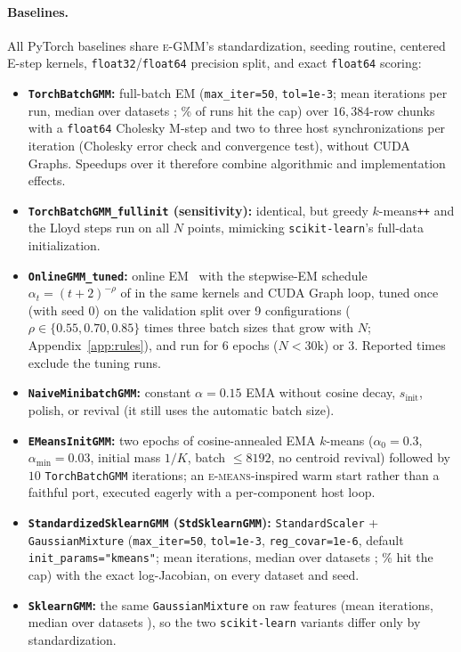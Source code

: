 \documentclass[10pt]{article} %
\newcommand{\egmm}{\textsc{e-GMM}}
\newcommand{\emeans}{\textsc{e-means}}
\begin{document}
\paragraph{Baselines.} All PyTorch baselines share \egmm{}'s standardization, seeding routine, centered E-step kernels, \texttt{float32}/\texttt{float64} precision split, and exact \texttt{float64} scoring:
\begin{itemize}[leftmargin=*,nosep]
  \item \textbf{\texttt{TorchBatchGMM}:} full-batch EM (\texttt{max\_iter=50}, \texttt{tol=1e-3}; mean \rItMeanTorchBatchGMM{} iterations per run, median over datasets \rItMedTorchBatchGMM{}; \rPCapShareTB\% of runs hit the cap) over $16{,}384$-row chunks with a \texttt{float64} Cholesky M-step and two to three host synchronizations per iteration (Cholesky error check and convergence test), without CUDA Graphs. Speedups over it therefore combine algorithmic and implementation effects.
  \item \textbf{\texttt{TorchBatchGMM\_fullinit} (sensitivity):} identical, but greedy $k$-means\texttt{++} and the Lloyd steps run on all $N$ points, mimicking \texttt{scikit-learn}'s full-data initialization.
  \item \textbf{\texttt{OnlineGMM\_tuned}:} online EM~\citep{cappe2009online} with the stepwise-EM schedule $\alpha_t = (t+2)^{-\rho}$ of \citet{liang2009online} in the same kernels and CUDA Graph loop, tuned once (with seed 0) on the validation split over 9 configurations ($\rho \in \{0.55, 0.70, 0.85\}$ times three batch sizes that grow with $N$; Appendix~\ref{app:rules}), and run for $6$ epochs ($N < 30\text{k}$) or $3$. Reported times exclude the tuning runs.
  \item \textbf{\texttt{NaiveMinibatchGMM}:} constant $\alpha = 0.15$ EMA without cosine decay, $s_{\mathrm{init}}$, polish, or revival (it still uses the automatic batch size).
  \item \textbf{\texttt{EMeansInitGMM}:} two epochs of cosine-annealed EMA $k$-means ($\alpha_0 = 0.3$, $\alpha_{\min} = 0.03$, initial mass $1/K$, batch $\le 8192$, no centroid revival) followed by $10$ \texttt{TorchBatchGMM} iterations; an \emeans{}-inspired warm start rather than a faithful port, executed eagerly with a per-component host loop.
  \item \textbf{\texttt{StandardizedSklearnGMM} (\texttt{StdSklearnGMM}):} \texttt{StandardScaler} + \texttt{GaussianMixture} (\texttt{max\_iter=50}, \texttt{tol=1e-3}, \texttt{reg\_covar=1e-6}, default \texttt{init\_params="kmeans"}; mean \rItMeanStandardizedSklearnGMM{} iterations, median over datasets \rItMedStandardizedSklearnGMM{}; \rPCapShareSK\% hit the cap) with the exact log-Jacobian, on every dataset and seed.
  \item \textbf{\texttt{SklearnGMM}:} the same \texttt{GaussianMixture} on raw features (mean \rItMeanSklearnGMM{} iterations, median over datasets \rItMedSklearnGMM{}), so the two \texttt{scikit-learn} variants differ only by standardization.
\end{itemize}
\end{document}
